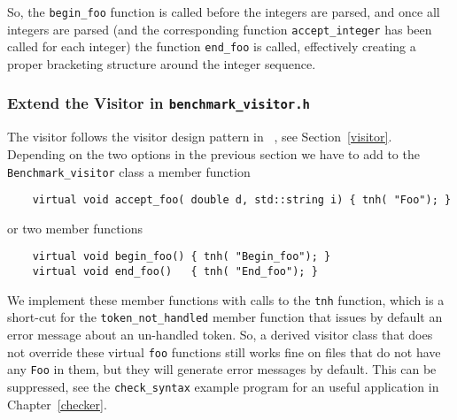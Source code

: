 \noindent
So, the \texttt{begin\_foo} function is called before the integers are
parsed, and once all integers are parsed (and the corresponding
function \texttt{accept\_integer} has been called for each integer) the
function \texttt{end\_foo} is called, effectively creating a proper
bracketing structure around the integer sequence.

\subsubsection{Extend the Visitor in \texttt{benchmark\_visitor.h}}
The visitor follows the visitor design pattern in
~\cite{cgal:ghjv-dpero-95}, see Section~\ref{visitor}.
Depending on the two options in the previous section we have to add to
the \texttt{Benchmark\_visitor} class a member function

\begin{verbatim}
    virtual void accept_foo( double d, std::string i) { tnh( "Foo"); }
\end{verbatim}

\noindent
or two member functions

\begin{verbatim}
    virtual void begin_foo() { tnh( "Begin_foo"); }
    virtual void end_foo()   { tnh( "End_foo"); }
\end{verbatim}

\noindent
We implement these member functions with calls to the \texttt{tnh}
function, which is a short-cut for the \texttt{token\_not\_handled}
member function that issues by default an error message about an
un-handled token. So, a derived visitor class that does not override
these virtual \texttt{foo} functions still works fine on files that do
not have any \texttt{Foo} in them, but they will generate error
messages by default. This can be suppressed, see the \texttt{check\_syntax}
example program for an useful application in Chapter~\ref{checker}.

